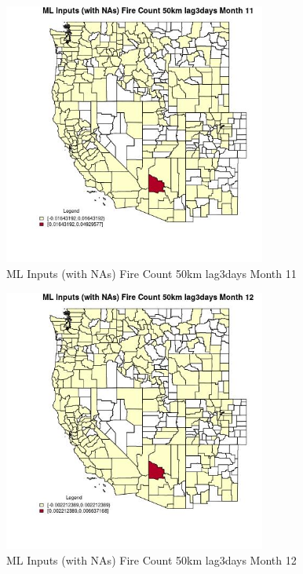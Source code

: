 \begin{figure} 
\centering  
\includegraphics[width=0.77\textwidth]{Code_Outputs/Report_ML_input_PM25_Step4_part_e_de_duplicated_aves_compiled_2019-05-21wNAs_CountyFire_Count_50km_lag3daysmedianMonth11.jpg} 
\caption{\label{fig:Report_ML_input_PM25_Step4_part_e_de_duplicated_aves_compiled_2019-05-21wNAsCountyFire_Count_50km_lag3daysmedianMonth11}ML Inputs (with NAs) Fire Count 50km lag3days Month 11} 
\end{figure} 
 

\begin{figure} 
\centering  
\includegraphics[width=0.77\textwidth]{Code_Outputs/Report_ML_input_PM25_Step4_part_e_de_duplicated_aves_compiled_2019-05-21wNAs_CountyFire_Count_50km_lag3daysmedianMonth12.jpg} 
\caption{\label{fig:Report_ML_input_PM25_Step4_part_e_de_duplicated_aves_compiled_2019-05-21wNAsCountyFire_Count_50km_lag3daysmedianMonth12}ML Inputs (with NAs) Fire Count 50km lag3days Month 12} 
\end{figure} 
 

